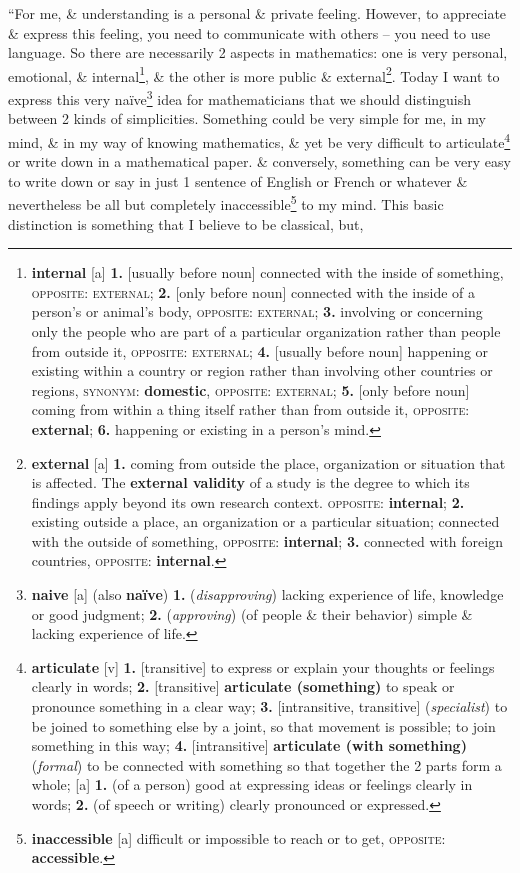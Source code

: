\documentclass[oneside]{book}
\numberwithin{equation}{section}
\begin{document}
``For me,  \& understanding is a personal \& private feeling. However, to appreciate \& express this feeling, you need to communicate with others -- you need to use language. So there are necessarily 2 aspects in mathematics: one is very personal, emotional, \& internal\footnote{\textbf{internal} [a] \textbf{1.} [usually before noun] connected with the inside of something, \textsc{opposite}: \textsc{external}; \textbf{2.} [only before noun] connected with the inside of a person's or animal's body, \textsc{opposite}: \textsc{external}; \textbf{3.} involving or concerning only the people who are part of a particular organization rather than people from outside it, \textsc{opposite}: \textsc{external}; \textbf{4.} [usually before noun] happening or existing within a country or region rather than involving other countries or regions, \textsc{synonym}: \textbf{domestic}, \textsc{opposite}: \textsc{external}; \textbf{5.} [only before noun] coming from within a thing itself rather than from outside it, \textsc{opposite}: \textbf{external}; \textbf{6.} happening or existing in a person's mind.}, \& the other is more public \& external\footnote{\textbf{external} [a] \textbf{1.} coming from outside the place, organization or situation that is affected. The \textbf{external validity} of a study is the degree to which its findings apply beyond its own research context. \textsc{opposite}: \textbf{internal}; \textbf{2.} existing outside a place, an organization or a particular situation; connected with the outside of something, \textsc{opposite}: \textbf{internal}; \textbf{3.} connected with foreign countries, \textsc{opposite}: \textbf{internal}.}. Today I want to express this very na\"ive\footnote{\textbf{naive} [a] (also \textbf{na\"ive}) \textbf{1.} (\textit{disapproving}) lacking experience of life, knowledge or good judgment; \textbf{2.} (\textit{approving}) (of people \& their behavior) simple \& lacking experience of life.} idea for mathematicians that we should distinguish between 2 kinds of simplicities. Something could be very simple for me, in my mind, \& in my way of knowing mathematics, \& yet be very difficult to articulate\footnote{\textbf{articulate} [v] \textbf{1.} [transitive] to express or explain your thoughts or feelings clearly in words; \textbf{2.} [transitive] \textbf{articulate (something)} to speak or pronounce something in a clear way; \textbf{3.} [intransitive, transitive] (\textit{specialist}) to be joined to something else by a joint, so that movement is possible; to join something in this way; \textbf{4.} [intransitive] \textbf{articulate (with something)} (\textit{formal}) to be connected with something so that together the 2 parts form a whole; [a] \textbf{1.} (of a person) good at expressing ideas or feelings clearly in words; \textbf{2.} (of speech or writing) clearly pronounced or expressed.} or write down in a mathematical paper. \& conversely, something can be very easy to write down or say in just 1 sentence of English or French or whatever \& nevertheless be all but completely inaccessible\footnote{\textbf{inaccessible} [a] difficult or impossible to reach or to get, \textsc{opposite}: \textbf{accessible}.} to my mind. This basic distinction is something that I believe to be classical, but, 
\end{document}
